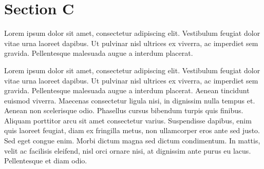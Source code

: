 \documentclass{article}
\begin{document}
\endnumbering

\section{Section C}

\begin{pairs}
\begin{Leftside} 
\beginnumbering  
\pstart  
Lorem ipsum dolor sit amet, consectetur adipiscing elit. Vestibulum feugiat dolor vitae urna laoreet dapibus. Ut pulvinar nisl ultrices ex viverra, ac imperdiet sem gravida. Pellentesque malesuada augue a interdum placerat. 
\pend  
\endnumbering 
\end{Leftside}

\begin{Rightside}   
\beginnumbering  
\pstart  
Lorem ipsum dolor sit amet, consectetur adipiscing elit. Vestibulum feugiat dolor vitae urna laoreet dapibus. Ut pulvinar nisl ultrices ex viverra, ac imperdiet sem gravida. Pellentesque malesuada augue a interdum placerat. Aenean tincidunt euismod viverra. Maecenas consectetur ligula nisi, in dignissim nulla tempus et. Aenean non scelerisque odio. Phasellus cursus bibendum turpis quis finibus. Aliquam porttitor arcu sit amet consectetur varius. Suspendisse dapibus, enim quis laoreet feugiat, diam ex fringilla metus, non ullamcorper eros ante sed justo. Sed eget congue enim. Morbi dictum magna sed dictum condimentum. In mattis, velit ac facilisis eleifend, nisl orci ornare nisi, at dignissim ante purus eu lacus. Pellentesque et diam odio.
\pend  
\endnumbering
\end{Rightside}
\end{pairs}
\Columns
\end{document}
